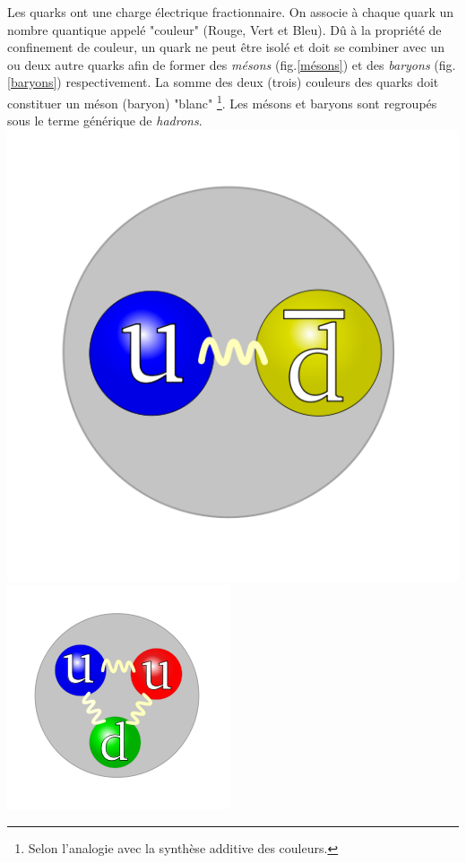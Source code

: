 Les quarks ont une charge électrique fractionnaire. On associe à chaque quark un nombre quantique appelé "couleur" (Rouge, Vert et Bleu). Dû à la propriété de confinement de couleur, un quark ne peut être isolé et doit se combiner avec un ou deux autre quarks afin de former des \textit{mésons} (fig.\ref{mésons}) et des \textit{baryons} (fig.\ref{baryons}) respectivement. La somme des deux (trois) couleurs des quarks doit constituer un méson (baryon) "blanc" \footnote{Selon l'analogie avec la synthèse additive des couleurs.}. Les mésons et baryons sont regroupés sous le terme générique de \textit{hadrons}.
\marginpar
{
\centering
\includegraphics[width=\marginparwidth]{SM/quarks2.png}
\label{mésons}
}
\marginpar
{
    \includegraphics[width=\marginparwidth]{SM/quarks.png}
    	\label{baryons}
}	
